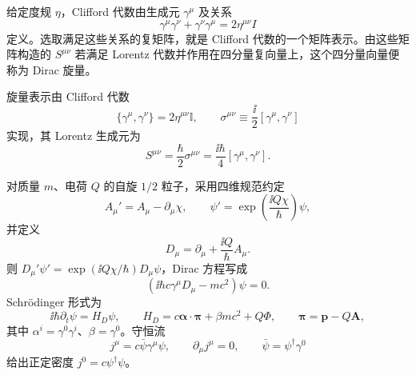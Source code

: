 \begin{definition}
给定度规 \(\eta\)，Clifford 代数由生成元
\(\gamma^\mu\) 及关系
\[
\gamma^\mu\gamma^\nu+\gamma^\nu\gamma^\mu
=2\eta^{\mu\nu}I
\]
定义。选取满足这些关系的复矩阵，就是 Clifford 代数的一个矩阵表示。由这些矩阵构造的
\(S^{\mu\nu}\) 若满足 Lorentz 代数并作用在四分量复向量上，这个四分量向量便称为 Dirac 旋量。
\end{definition}

旋量表示由 Clifford 代数
\begin{equation}
\{\gamma^\mu,\gamma^\nu\}=2\eta^{\mu\nu}\mathbb I,
\qquad
\sigma^{\mu\nu}\equiv\frac{\ii}{2}[\gamma^\mu,\gamma^\nu]
\label{eq:clifford-algebra}
\end{equation}
实现，其 Lorentz 生成元为
\begin{equation}
S^{\mu\nu}=\frac{\hbar}{2}\sigma^{\mu\nu}
=\frac{\ii\hbar}{4}[\gamma^\mu,\gamma^\nu].
\label{eq:spinor-lorentz-generator}
\end{equation}

对质量 $m$、电荷 $Q$ 的自旋 $1/2$ 粒子，采用四维规范约定
\[
A_\mu' = A_\mu-\partial_\mu\chi,
\qquad
\psi'=\exp\!\left(\frac{\ii Q\chi}{\hbar}\right)\psi,
\]
并定义
\[
D_\mu=\partial_\mu+\frac{\ii Q}{\hbar}A_\mu.
\]
则 $D_\mu'\psi'=\exp(\ii Q\chi/\hbar)D_\mu\psi$，Dirac 方程写成
\begin{equation}
\left(\ii\hbar c\gamma^\mu D_\mu-mc^2\right)\psi=0.
\label{eq:dirac}
\end{equation}
Schr\"odinger 形式为
\begin{equation}
\ii\hbar\partial_t\psi
=H_D\psi,
\qquad
H_D=c\boldsymbol\alpha\cdot\boldsymbol\pi
+\beta mc^2+Q\Phi,
\qquad
\boldsymbol\pi=\mathbf p-Q\mathbf A,
\label{eq:dirac-hamiltonian-em}
\end{equation}
其中 $\alpha^i=\gamma^0\gamma^i$、$\beta=\gamma^0$。守恒流
\begin{equation}
j^\mu=c\bar\psi\gamma^\mu\psi,
\qquad
\partial_\mu j^\mu=0,
\qquad
\bar\psi=\psi^\dagger\gamma^0
\label{eq:dirac-current}
\end{equation}
给出正定密度 $j^0=c\psi^\dagger\psi$。

